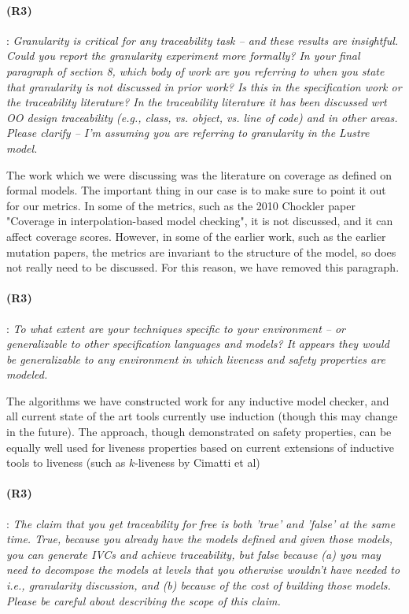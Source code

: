 \documentclass{article}
\begin{document}
\paragraph{(R3)}: \textit{Granularity is critical for any traceability task -- and these results are insightful. Could you report the granularity experiment more formally? In your final paragraph of section 8, which body of work are you referring to when you state that granularity is not discussed in prior work? Is this in the specification work or the traceability literature? In the traceability literature it has been discussed wrt OO design traceability (e.g., class, vs. object, vs. line of code) and in other areas. Please clarify -- I'm assuming you are referring to granularity in the Lustre model.}
\vspace{0.05in}

The work which we were discussing was the literature on coverage as defined on formal models.  The important thing in our case is to make sure to point it out for our metrics.  In some of the metrics, such as the 2010 Chockler paper "Coverage in interpolation-based model checking", it is not discussed, and it can affect coverage scores.  However, in some of the earlier work, such as the earlier mutation papers, the metrics are invariant to the structure of the model, so does not really need to be discussed.  For this reason, we have removed this paragraph.


\paragraph{(R3)}: \textit{To what extent are your techniques specific to your environment -- or generalizable to other specification languages and models? It appears they would be generalizable to any environment in which liveness and safety properties are modeled.}
\vspace{0.05in}

The algorithms we have constructed work for any inductive model checker, and all current state of the art tools currently use induction (though this may change in the future).  The approach, though demonstrated on safety properties, can be equally well used for liveness properties based on current extensions of inductive tools to liveness (such as $k$-liveness by Cimatti et al)

\paragraph{(R3)}: \textit{The claim that you get traceability for free is both 'true' and 'false' at the same time. True, because you already have the models defined and given those models, you can generate IVCs and achieve traceability, but false because   (a) you may need to decompose the models at levels that you otherwise wouldn't have needed to i.e., granularity discussion, and  (b) because of the cost of building those models.   Please be careful about describing the scope of this claim.}
\vspace{0.05in}
\end{document}
